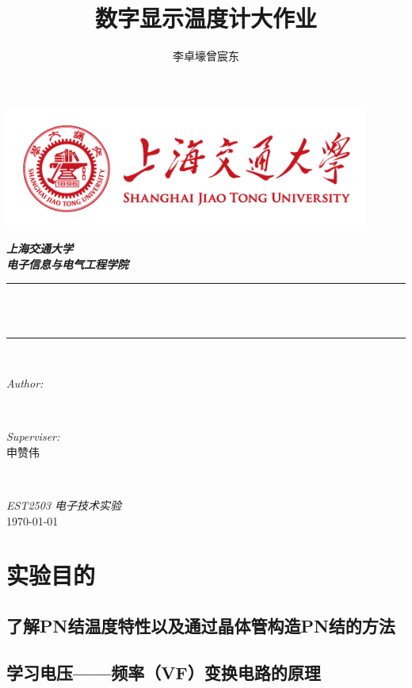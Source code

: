 \documentclass[12pt,a4paper]{ctexart}
\title{数字显示温度计大作业}
\author{\textup{李卓壕\quad 曾宸东}}
\begin{document}
\begin{titlepage}
  \newcommand{\HRule}{\rule{\linewidth}{0.5mm}}
  \includegraphics[width=12cm]{title/logo.png}\\[1cm]
  \center

  \textsl{\Large \textbf{上海交通大学} }\\[0.5cm]
  \textsl{\large \textbf{电子信息与电气工程学院}}\\[0.5cm]
  \makeatletter
  \HRule \\[0.4cm]
  { \huge \bfseries \@title}\\[0.4cm]
  \HRule \\[1.5cm]
  \begin{minipage}{0.4\textwidth}
    \begin{flushleft} \large
      \emph{Author:}\\
      \@author
    \end{flushleft}
  \end{minipage}
  ~
  \begin{minipage}{0.4\textwidth}
    \begin{flushright} \large
      \emph{Superviser:} \\
      \textup{申赞伟}
    \end{flushright}
  \end{minipage}\\[3cm]
  \makeatother

  {\large \emph{EST2503 \quad 电子技术实验}}\\[0.5cm]
  {\large \today}\\[2cm]
  \vfill
\end{titlepage}
\tableofcontents
\section{实验目的}
\subsection{了解PN结温度特性以及通过晶体管构造PN结的方法}
\subsection{学习电压——频率（VF）变换电路的原理}
\end{document}
